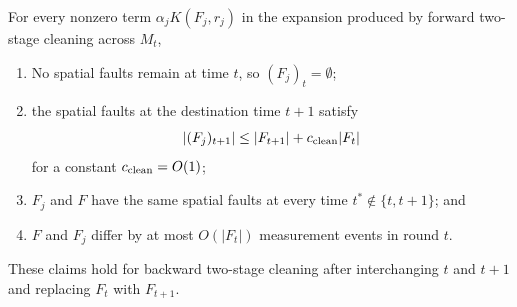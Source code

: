 \documentclass[11pt]{article}
\begin{document}
\begin{corollary}
\label{cor:two-stage-fault-support}
For every nonzero term $\alpha_jK(F_j,r_j)$ in the expansion produced by forward two-stage cleaning across $M_t$,
\begin{enumerate}
    \item No spatial faults remain at time $t$, so $(F_j)_t=\emptyset$;
    \item the spatial faults at the destination time $t+1$ satisfy \[
    |(F_j)_{t+1}| \le |F_{t+1}| + c_{\rm{clean}}|F_t|
    \]
    for a constant $c_{\rm{clean}}=O(1)$;
    \item $F_j$ and $F$ have the same spatial faults at every time
    $t^*\notin\{t,t+1\}$; and
    \item $F$ and $F_j$ differ by at most $O(|F_t|)$ measurement events in round $t$.
\end{enumerate}
These claims hold for backward two-stage cleaning after interchanging $t$ and $t+1$ and replacing $F_t$ with $F_{t+1}$.
\end{corollary}
\end{document}
